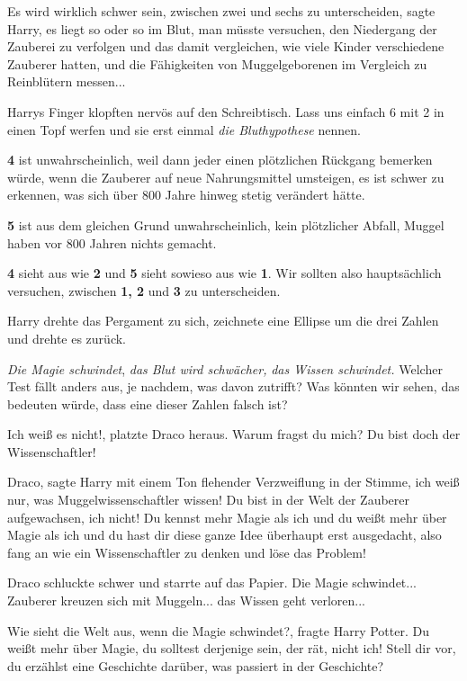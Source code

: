 \glqq Es wird wirklich schwer sein, zwischen zwei und sechs zu
unterscheiden\grqq{}, sagte Harry, \glqq es liegt so oder so im Blut, man müsste
versuchen, den Niedergang der Zauberei zu verfolgen und das damit vergleichen,
wie viele Kinder verschiedene Zauberer hatten, und die Fähigkeiten von
Muggelgeborenen im Vergleich zu Reinblütern messen...\grqq{}

Harrys Finger klopften nervös auf den Schreibtisch. \glqq Lass uns einfach 6 mit
2 in einen Topf werfen und sie erst einmal \emph{die Bluthypothese} nennen.

\textbf{4 }ist unwahrscheinlich, weil dann jeder einen plötzlichen Rückgang
bemerken würde, wenn die Zauberer auf neue Nahrungsmittel umsteigen, es ist
schwer zu erkennen, was sich über 800 Jahre hinweg stetig verändert hätte.

\textbf{5 }ist aus dem gleichen Grund unwahrscheinlich, kein plötzlicher Abfall,
Muggel haben vor 800 Jahren nichts gemacht.

\textbf{4} sieht aus wie \textbf{2} und \textbf{5} sieht sowieso aus wie
\textbf{1}. Wir sollten also hauptsächlich versuchen, zwischen \textbf{1, 2} und
\textbf{3} zu unterscheiden.\grqq{}

Harry drehte das Pergament zu sich, zeichnete eine Ellipse um die drei Zahlen
und drehte es zurück.

\glqq \emph{Die Magie schwindet}, \emph{das Blut wird schwächer,} \emph{das
Wissen schwindet.} Welcher Test fällt anders aus, je nachdem, was davon
zutrifft? Was könnten wir sehen, das bedeuten würde, dass eine dieser Zahlen
falsch ist?\grqq{}

\glqq Ich weiß es nicht!\grqq{}, platzte Draco heraus. \glqq Warum fragst du
mich? Du bist doch der Wissenschaftler!\grqq{}

\glqq Draco\grqq{}, sagte Harry mit einem Ton flehender Verzweiflung in der
Stimme, \glqq ich weiß nur, was Muggelwissenschaftler wissen! Du bist in der
Welt der Zauberer aufgewachsen, ich nicht! Du kennst mehr Magie als ich und du
weißt mehr über Magie als ich und du hast dir diese ganze Idee überhaupt erst
ausgedacht, also fang an wie ein Wissenschaftler zu denken und löse das
Problem!\grqq{}

Draco schluckte schwer und starrte auf das Papier. Die Magie schwindet...
Zauberer kreuzen sich mit Muggeln... das Wissen geht verloren...

\glqq Wie sieht die Welt aus, wenn die Magie schwindet?\grqq{}, fragte Harry
Potter. \glqq Du weißt mehr über Magie, du solltest derjenige sein, der rät,
nicht ich! Stell dir vor, du erzählst eine Geschichte darüber, was passiert in
der Geschichte?\grqq{}

